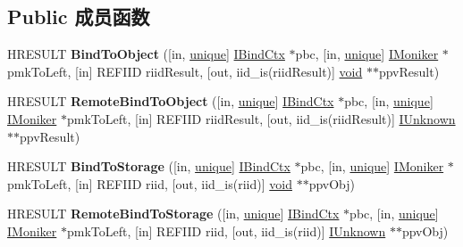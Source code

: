 \subsection*{Public 成员函数}
\begin{DoxyCompactItemize}
\item 
\mbox{\label{interface_i_moniker_a5b908ab57f5fb29049b364f98f850772}} 
H\+R\+E\+S\+U\+LT {\bfseries Bind\+To\+Object} (\mbox{[}in, \hyperlink{interfaceunique}{unique}\mbox{]} \hyperlink{interface_i_bind_ctx}{I\+Bind\+Ctx} $\ast$pbc, \mbox{[}in, \hyperlink{interfaceunique}{unique}\mbox{]} \hyperlink{interface_i_moniker}{I\+Moniker} $\ast$pmk\+To\+Left, \mbox{[}in\mbox{]} R\+E\+F\+I\+ID riid\+Result, \mbox{[}out, iid\+\_\+is(riid\+Result)\mbox{]} \hyperlink{interfacevoid}{void} $\ast$$\ast$ppv\+Result)
\item 
\mbox{\label{interface_i_moniker_a874aeec7ac8a077ac978e1376ee50138}} 
H\+R\+E\+S\+U\+LT {\bfseries Remote\+Bind\+To\+Object} (\mbox{[}in, \hyperlink{interfaceunique}{unique}\mbox{]} \hyperlink{interface_i_bind_ctx}{I\+Bind\+Ctx} $\ast$pbc, \mbox{[}in, \hyperlink{interfaceunique}{unique}\mbox{]} \hyperlink{interface_i_moniker}{I\+Moniker} $\ast$pmk\+To\+Left, \mbox{[}in\mbox{]} R\+E\+F\+I\+ID riid\+Result, \mbox{[}out, iid\+\_\+is(riid\+Result)\mbox{]} \hyperlink{interface_i_unknown}{I\+Unknown} $\ast$$\ast$ppv\+Result)
\item 
\mbox{\label{interface_i_moniker_a902ef045db76f8fe4d78928dcfd86f40}} 
H\+R\+E\+S\+U\+LT {\bfseries Bind\+To\+Storage} (\mbox{[}in, \hyperlink{interfaceunique}{unique}\mbox{]} \hyperlink{interface_i_bind_ctx}{I\+Bind\+Ctx} $\ast$pbc, \mbox{[}in, \hyperlink{interfaceunique}{unique}\mbox{]} \hyperlink{interface_i_moniker}{I\+Moniker} $\ast$pmk\+To\+Left, \mbox{[}in\mbox{]} R\+E\+F\+I\+ID riid, \mbox{[}out, iid\+\_\+is(riid)\mbox{]} \hyperlink{interfacevoid}{void} $\ast$$\ast$ppv\+Obj)
\item 
\mbox{\label{interface_i_moniker_a96c82794cd66b0c51176b500b841dfc9}} 
H\+R\+E\+S\+U\+LT {\bfseries Remote\+Bind\+To\+Storage} (\mbox{[}in, \hyperlink{interfaceunique}{unique}\mbox{]} \hyperlink{interface_i_bind_ctx}{I\+Bind\+Ctx} $\ast$pbc, \mbox{[}in, \hyperlink{interfaceunique}{unique}\mbox{]} \hyperlink{interface_i_moniker}{I\+Moniker} $\ast$pmk\+To\+Left, \mbox{[}in\mbox{]} R\+E\+F\+I\+ID riid, \mbox{[}out, iid\+\_\+is(riid)\mbox{]} \hyperlink{interface_i_unknown}{I\+Unknown} $\ast$$\ast$ppv\+Obj)

\end{DoxyCompactItemize}
